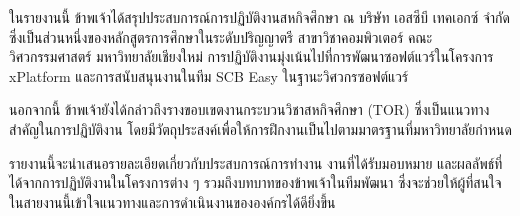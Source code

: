 \maketitle
\makesignature

\ifproject
\begin{abstractTH}
    ในรายงานนี้ ข้าพเจ้าได้สรุปประสบการณ์การปฏิบัติงานสหกิจศึกษา ณ บริษัท เอสซีบี เทคเอกซ์ จำกัด ซึ่งเป็นส่วนหนึ่งของหลักสูตรการศึกษาในระดับปริญญาตรี สาขาวิชาคอมพิวเตอร์ คณะวิศวกรรมศาสตร์ มหาวิทยาลัยเชียงใหม่ การปฏิบัติงานมุ่งเน้นไปที่การพัฒนาซอฟต์แวร์ในโครงการ xPlatform และการสนับสนุนงานในทีม SCB Easy ในฐานะวิศวกรซอฟต์แวร์
    
    นอกจากนี้ ข้าพเจ้ายังได้กล่าวถึงรางขอบเขตงานกระบวนวิชาสหกิจศึกษา (TOR) ซึ่งเป็นแนวทางสำคัญในการปฏิบัติงาน โดยมีวัตถุประสงค์เพื่อให้การฝึกงานเป็นไปตามมาตรฐานที่มหาวิทยาลัยกำหนด
    
    รายงานนี้จะนำเสนอรายละเอียดเกี่ยวกับประสบการณ์การทำงาน งานที่ได้รับมอบหมาย และผลลัพธ์ที่ได้จากการปฏิบัติงานในโครงการต่าง ๆ รวมถึงบทบาทของข้าพเจ้าในทีมพัฒนา ซึ่งจะช่วยให้ผู้ที่สนใจในสายงานนี้เข้าใจแนวทางและการดำเนินงานขององค์กรได้ดียิ่งขึ้น
\end{abstractTH}
    
    


\iffalse
\begin{dedication}
This document is dedicated to all Chiang Mai University students.

Dedication page is optional.
\end{dedication}
\fi %

